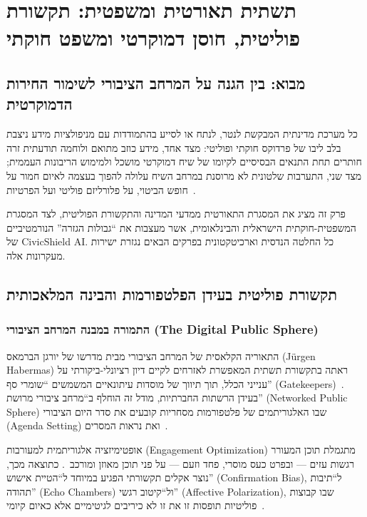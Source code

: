 \chapter{תשתית תאורטית ומשפטית: תקשורת פוליטית, חוסן דמוקרטי ומשפט חוקתי}
\label{ch:theory_law}

\section{מבוא: בין הגנה על המרחב הציבורי לשימור החירות הדמוקרטית}
\label{sec:theory_intro}

כל מערכת מדינתית המבקשת לנטר, לנתח או לסייע בהתמודדות עם מניפולציות מידע ניצבת בלב ליבו של פרדוקס חוקתי ופוליטי: מצד אחד, מידע כוזב מתואם ולוחמה תודעתית זרה חותרים תחת התנאים הבסיסיים לקיומו של שיח דמוקרטי מושכל ולמימוש הריבונות העממית; מצד שני, התערבות שלטונית לא מרוסנת במרחב השיח עלולה להפוך בעצמה לאיום חמור על חופש הביטוי, על פלורליזם פוליטי ועל הפרטיות~\cite{sunstein2017republic}.

פרק זה מציג את המסגרת התאורטית ממדעי המדינה והתקשורת הפוליטית, לצד המסגרת המשפטית-חוקתית הישראלית והבינלאומית, אשר מעצבות את ``גבולות הגזרה'' הנורמטיביים של \textenglish{CivicShield AI}. כל החלטה הנדסית וארכיטקטונית בפרקים הבאים נגזרת ישירות מעקרונות אלה.

\section{תקשורת פוליטית בעידן הפלטפורמות והבינה המלאכותית}
\label{sec:pol_comm}

\subsection{התמורה במבנה המרחב הציבורי (\textenglish{The Digital Public Sphere})}

התאוריה הקלאסית של המרחב הציבורי מבית מדרשו של יורגן הברמאס (\textenglish{Jürgen Habermas}) ראתה בתקשורת תשתית המאפשרת לאזרחים לקיים דיון רציונלי-ביקורתי על ענייני הכלל, תוך תיווך של מוסדות עיתונאיים המשמשים ``שומרי סף'' (\textenglish{Gatekeepers})~\cite{habermas1989structural}. בעידן הרשתות החברתיות, מודל זה הוחלף ב``מרחב ציבורי מרושת'' (\textenglish{Networked Public Sphere}) שבו האלגוריתמים של פלטפורמות מסחריות קובעים את סדר היום הציבורי (\textenglish{Agenda Setting}) ואת נראות המסרים~\cite{benkler2018network}.

אופטימיזציה אלגוריתמית למעורבות (\textenglish{Engagement Optimization}) מתגמלת תוכן המעורר רגשות עזים --- ובפרט כעס מוסרי, פחד וזעם --- על פני תוכן מאוזן ומורכב~\cite{vosoughi2018spread}. כתוצאה מכך, נוצר אקלים תקשורתי הפגיע במיוחד ל``הטיית אישוש'' (\textenglish{Confirmation Bias}), ל``תיבות תהודה'' (\textenglish{Echo Chambers}) ול``קיטוב רגשי'' (\textenglish{Affective Polarization}), שבו קבוצות פוליטיות תופסות זו את זו לא כיריבים לגיטימיים אלא כאיום קיומי~\cite{iyengar2019origins}.

